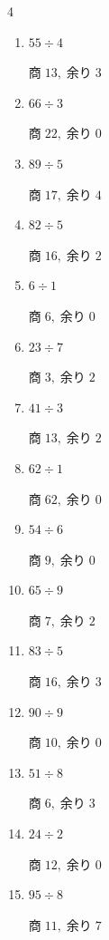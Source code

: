 \begin{multicols}{4}
\begin{enumerate}
  \item $55 \div 4$

        $商\; 13,\; 余り\; 3$

  \item $66 \div 3$

        $商\; 22,\; 余り\; 0$

  \item $89 \div 5$

        $商\; 17,\; 余り\; 4$

\columnbreak %

  \item $82 \div 5$

        $商\; 16,\; 余り\; 2$

  \item $6 \div 1$

        $商\; 6,\; 余り\; 0$

  \item $23 \div 7$

        $商\; 3,\; 余り\; 2$

  \item $41 \div 3$

        $商\; 13,\; 余り\; 2$

  \item $62 \div 1$

        $商\; 62,\; 余り\; 0$

  \item $54 \div 6$

        $商\; 9,\; 余り\; 0$

  \item $65 \div 9$

        $商\; 7,\; 余り\; 2$

  \item $83 \div 5$

        $商\; 16,\; 余り\; 3$

  \item $90 \div 9$

        $商\; 10,\; 余り\; 0$

  \item $51 \div 8$

        $商\; 6,\; 余り\; 3$

  \item $24 \div 2$

        $商\; 12,\; 余り\; 0$

  \item $95 \div 8$

        $商\; 11,\; 余り\; 7$


\end{enumerate}
\end{multicols}
